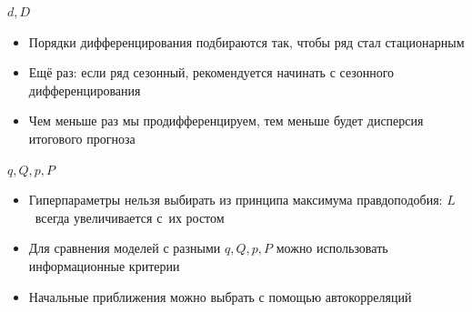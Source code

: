 \documentclass[9pt,pdf,utf8,hyperref={unicode},aspectratio=169]{beamer}
\begin{document}
\begin{frame}{$d, D$}
	\begin{itemize}
		\item Порядки дифференцирования подбираются так, чтобы ряд стал стационарным
		\item Ещё раз: если ряд сезонный, рекомендуется начинать с сезонного дифференцирования
		\item Чем меньше раз мы продифференцируем, тем меньше будет дисперсия итогового прогноза
	\end{itemize}
\end{frame}

\begin{frame}{$q, Q, p, P$}
	\begin{itemize}
		\item Гиперпараметры нельзя выбирать из принципа максимума правдоподобия: $L$~всегда увеличивается с~их ростом
		\item Для сравнения моделей с разными $q, Q, p, P$ можно использовать информационные критерии
		\item Начальные приближения можно выбрать с помощью автокорреляций
	\end{itemize}
\end{frame}
\end{document}
